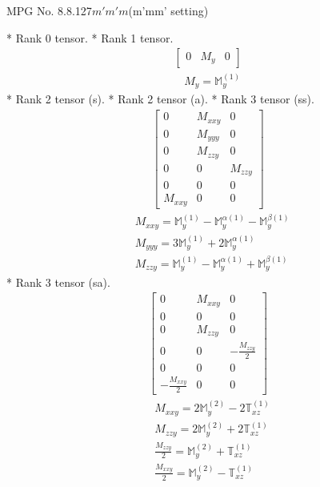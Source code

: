 \documentclass[fleqn,8pt,landscape]{jsarticle}
\begin{document}
\setcounter{MaxMatrixCols}{32}

\renewcommand{\tablename}{Table~}
\renewcommand{\figurename}{Figure~}
\begin{center}
\LARGE
MPG No. 8.8.127\quad$m'm'm$\quad(m'mm' setting)
\end{center}
* Rank 0 tensor.
* Rank 1 tensor.
\begin{align*}
\begin{bmatrix} 0 & M_{y} & 0 \end{bmatrix}
\end{align*}
\begin{align*}
& M_{y} = \mathbb{M}_{y}^{(1)}
\end{align*}
* Rank 2 tensor (s).
* Rank 2 tensor (a).
* Rank 3 tensor (ss).
\begin{align*}
\begin{bmatrix} 0 & M_{xxy} & 0 \\ 0 & M_{yyy} & 0 \\ 0 & M_{zzy} & 0 \\ 0 & 0 & M_{zzy} \\ 0 & 0 & 0 \\ M_{xxy} & 0 & 0 \end{bmatrix}
\end{align*}
\begin{align*}
& M_{xxy} = \mathbb{M}_{y}^{(1)} - \mathbb{M}_{y}^{\alpha(1)} - \mathbb{M}_{y}^{\beta(1)} \\
& M_{yyy} = 3 \mathbb{M}_{y}^{(1)} + 2 \mathbb{M}_{y}^{\alpha(1)} \\
& M_{zzy} = \mathbb{M}_{y}^{(1)} - \mathbb{M}_{y}^{\alpha(1)} + \mathbb{M}_{y}^{\beta(1)}
\end{align*}
* Rank 3 tensor (sa).
\begin{align*}
\begin{bmatrix} 0 & M_{xxy} & 0 \\ 0 & 0 & 0 \\ 0 & M_{zzy} & 0 \\ 0 & 0 & - \frac{M_{zzy}}{2} \\ 0 & 0 & 0 \\ - \frac{M_{xxy}}{2} & 0 & 0 \end{bmatrix}
\end{align*}
\begin{align*}
& M_{xxy} = 2 \mathbb{M}_{y}^{(2)} - 2 \mathbb{T}_{xz}^{(1)} \\
& M_{zzy} = 2 \mathbb{M}_{y}^{(2)} + 2 \mathbb{T}_{xz}^{(1)} \\
& \frac{M_{zzy}}{2} = \mathbb{M}_{y}^{(2)} + \mathbb{T}_{xz}^{(1)} \\
& \frac{M_{xxy}}{2} = \mathbb{M}_{y}^{(2)} - \mathbb{T}_{xz}^{(1)}
\end{align*}
\end{document}
